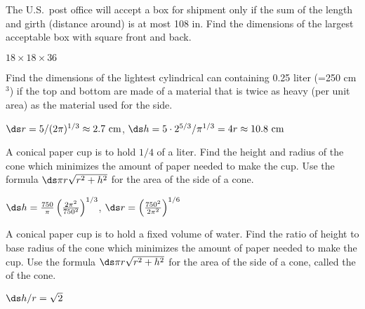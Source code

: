 \begin{enumialphparenastyle}
\begin{ex}
The U.S.~post office will accept a box for shipment only if the sum of the
length and girth (distance around) is at most 108 in.  Find the dimensions
of the largest acceptable box with square front and back.
\begin{sol}
 $18\times18\times36$
\end{sol}
\end{ex}

\begin{ex}
Find the dimensions of the lightest cylindrical can containing 0.25 liter
(=250 cm${}^3$) if the top and bottom are made of a material that is twice
as heavy (per unit area) as the material used for the side.
\begin{sol}
 $\ds r=5/(2\pi)^{1/3}\approx 2.7\hbox{ cm}$,\hfill\break
$\ds h=5\cdot2^{5/3}/\pi^{1/3}=4r\approx 10.8 \hbox{ cm}$
\end{sol}
\end{ex}

\begin{ex}
 A conical paper cup is to hold $1/4$ of a liter. Find the
height and radius of the cone which minimizes
the amount of paper needed to make the cup.  Use the formula $\ds \pi
r\sqrt{r^2+h^2}$ for the area of the side of a cone.
\begin{sol}
 $\ds h={750\over\pi}\left({2\pi^2\over 750^2}\right)^{1/3}$, 
$\ds r=\left({750^2\over 2\pi^2}\right)^{1/6}$
\end{sol}
\end{ex}

\begin{ex}
 A conical paper cup is to hold a fixed volume of water.
Find the ratio of height to base radius of the cone which minimizes
the amount of paper needed to make the cup.  Use the formula $\ds \pi
r\sqrt{r^2+h^2}$ for the area of the side of a cone, called the
 of the cone.
\begin{sol}
 $\ds h/r=\sqrt2$
\end{sol}
\end{ex}


\end{enumialphparenastyle}
